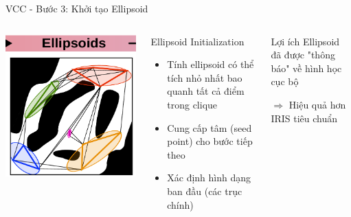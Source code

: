 \documentclass[aspectratio=169]{beamer}
\begin{document}
\begin{frame}{VCC - Bước 3: Khởi tạo Ellipsoid}
    \begin{columns}[c]
        \centering
        \includegraphics[width=\textwidth]{imgs/VCC-3.png}

        \begin{block}{Ellipsoid Initialization}
            \small
            \begin{itemize}
                \item Tính ellipsoid có thể tích nhỏ nhất bao quanh tất cả điểm trong clique
                \item Cung cấp tâm (seed point) cho bước tiếp theo
                \item Xác định hình dạng ban đầu (các trục chính)
            \end{itemize}
        \end{block}

        \begin{alertblock}{Lợi ích}
            \small
            Ellipsoid đã được "thông báo" về hình học cục bộ
            
            \vspace{0.2cm}
            $\Rightarrow$ Hiệu quả hơn IRIS tiêu chuẩn
        \end{alertblock}
    \end{columns}
\end{frame}
\end{document}

